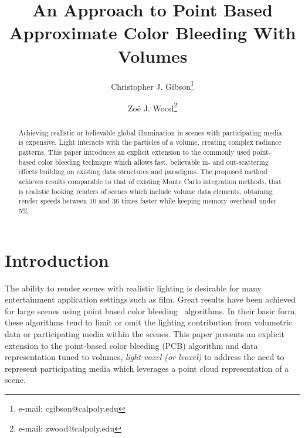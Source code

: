 \documentclass[runningheads]{llncs}
\begin{document}
\pagestyle{headings}

\author{Christopher J. Gibson\thanks{e-mail: cgibson@calpoly.edu}
\and Zo\"{e} J. Wood\thanks{e-mail: zwood@calpoly.edu}}


\mainmatter

\title{An Approach to Point Based Approximate Color Bleeding With Volumes}


\maketitle


\begin{abstract}
Achieving realistic or believable global illumination in scenes with participating media is expensive.  Light interacts with the particles of a volume, creating complex radiance patterns.  This paper introduces an explicit extension to the commonly used point-based color bleeding technique which allows fast, believable in- and out-scattering effects building on existing data structures and paradigms.  The proposed method achieves results comparable to that of existing Monte Carlo integration methods, that is realistic looking renders of scenes which include volume data elements, obtaining render speeds between 10 and 36 times faster while keeping memory overhead under 5\%.
\end{abstract}



\section{Introduction}
The ability to render scenes with realistic lighting is desirable for many entertainment application settings such as film.  Great results have been achieved for large scenes using point based color bleeding~\cite{christensen:2008} algorithms.  In their basic form, these algorithms tend to limit or omit the lighting contribution from volumetric data or participating media within the scenes.  This paper presents an explicit extension to the point-based color bleeding (PCB) algorithm and data representation tuned to volumes,  \emph{light-voxel (or lvoxel)} to address the need to represent participating media which leverages a point cloud representation of a scene.  
\end{document}
